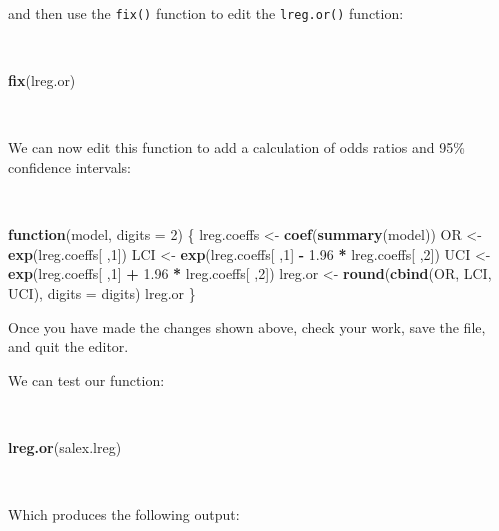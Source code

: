 \documentclass[12pt,a4paper]{book}
\newenvironment{Shaded}{\begin{snugshade}}{\end{snugshade}}
\newcommand{\KeywordTok}[1]{\textcolor[rgb]{0.13,0.29,0.53}{\textbf{#1}}}
\newcommand{\DataTypeTok}[1]{\textcolor[rgb]{0.13,0.29,0.53}{#1}}
\newcommand{\DecValTok}[1]{\textcolor[rgb]{0.00,0.00,0.81}{#1}}
\newcommand{\FloatTok}[1]{\textcolor[rgb]{0.00,0.00,0.81}{#1}}
\newcommand{\StringTok}[1]{\textcolor[rgb]{0.31,0.60,0.02}{#1}}
\newcommand{\ControlFlowTok}[1]{\textcolor[rgb]{0.13,0.29,0.53}{\textbf{#1}}}
\newcommand{\OperatorTok}[1]{\textcolor[rgb]{0.81,0.36,0.00}{\textbf{#1}}}
\newcommand{\NormalTok}[1]{#1}
\theoremstyle{definition}
\theoremstyle{definition}
\theoremstyle{definition}
\theoremstyle{remark}
\begin{document}
and then use the \texttt{fix()} function to edit the \texttt{lreg.or()}
function:

~

\begin{Shaded}
\begin{Highlighting}[]
\KeywordTok{fix}\NormalTok{(lreg.or)}
\end{Highlighting}
\end{Shaded}

~

We can now edit this function to add a calculation of odds ratios and
95\% confidence intervals:

~

\begin{Shaded}
\begin{Highlighting}[]
\ControlFlowTok{function}\NormalTok{(model, }\DataTypeTok{digits =} \DecValTok{2}\NormalTok{) \{}
\NormalTok{  lreg.coeffs <-}\StringTok{ }\KeywordTok{coef}\NormalTok{(}\KeywordTok{summary}\NormalTok{(model))}
\NormalTok{  OR <-}\StringTok{ }\KeywordTok{exp}\NormalTok{(lreg.coeffs[ ,}\DecValTok{1}\NormalTok{])}
\NormalTok{  LCI <-}\StringTok{ }\KeywordTok{exp}\NormalTok{(lreg.coeffs[ ,}\DecValTok{1}\NormalTok{] }\OperatorTok{-}\StringTok{ }\FloatTok{1.96} \OperatorTok{*}\StringTok{ }\NormalTok{lreg.coeffs[ ,}\DecValTok{2}\NormalTok{])}
\NormalTok{  UCI <-}\StringTok{ }\KeywordTok{exp}\NormalTok{(lreg.coeffs[ ,}\DecValTok{1}\NormalTok{] }\OperatorTok{+}\StringTok{ }\FloatTok{1.96} \OperatorTok{*}\StringTok{ }\NormalTok{lreg.coeffs[ ,}\DecValTok{2}\NormalTok{])}
\NormalTok{  lreg.or <-}\StringTok{ }\KeywordTok{round}\NormalTok{(}\KeywordTok{cbind}\NormalTok{(OR, LCI, UCI), }\DataTypeTok{digits =}\NormalTok{ digits)}
\NormalTok{  lreg.or}
\NormalTok{\}}
\end{Highlighting}
\end{Shaded}

\newpage

Once you have made the changes shown above, check your work, save the
file, and quit the editor.

We can test our function:

~

\begin{Shaded}
\begin{Highlighting}[]
\KeywordTok{lreg.or}\NormalTok{(salex.lreg)}
\end{Highlighting}
\end{Shaded}

~

Which produces the following output:
\end{document}
